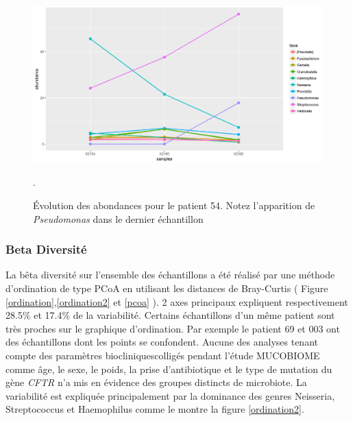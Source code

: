 \documentclass[12pt,a4paper]{article}
\begin{document}
\begin{figure}
\begin{center}
\includegraphics[scale=0.60]{img/curve_054.png}\hfill
\end{center}
\caption{Évolution des abondances pour le patient 54. Notez l'apparition de \textit{Pseudomonas} dans le dernier échantillon}.
\label{evolution54}
\end{figure}

\subsubsection{Beta Diversité}
La bêta diversité sur l’ensemble des échantillons a été réalisé par une méthode d’ordination de type PCoA en utilisant les distances de Bray-Curtis ( Figure \ref{ordination},\ref{ordination2} et \ref{pcoa} ).
2 axes principaux expliquent respectivement 28.5\% et 17.4\% de la variabilité.
Certains échantillons d’un même patient sont très proches sur le graphique d’ordination. Par exemple le patient 69 et 003 ont des échantillons dont les points se confondent.
Aucune des analyses tenant compte des paramètres biocliniquescolligés pendant l'étude MUCOBIOME comme âge, le sexe, le poids, la prise d'antibiotique et le type de mutation du gène \textit{CFTR} n’a mis en évidence des groupes distincts de microbiote. La variabilité est expliquée principalement par la dominance des genres Neisseria, Streptococcus et Haemophilus comme le montre la figure \ref{ordination2}.
\end{document}
